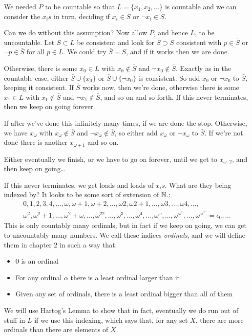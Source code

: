 \documentclass[10pt,a4paper]{article}
\begin{document}
We needed $P$ to be countable so that $L = \{x_1, x_2, \ldots\}$ is countable and we can consider the $x_is$ in turn, deciding if $x_i \in \bar{S}$ or $\neg x_i \in \bar{S}$.

Can we do without this assumption? Now allow $P$, and hence $L$, to be uncountable. Let $S \subset L$ be consistent and look for $\bar{S} \supset S$ consistent with $p \in \bar{S}$ or $\neg p \in \bar{S}$ for all $p \in L$. We could try $\bar{S} = S$, and if it works then we are done.

Otherwise, there is some $x_0 \in L$ with $x_0 \notin \bar{S}$ and $\neg x_0 \notin \bar{S}$. Exactly as in the countable case, either $\bar{S}\cup\{x_0\}$ or $\bar{S} \cup \{\neg x_0\}$ is consistent. So add $x_0$ or $\neg x_0$ to $\bar{S}$, keeping it consistent. If $\bar{S}$ works now, then we're done, otherwise there is some $x_1 \in L$ with $x_1 \notin \bar{S}$ and $\neg x_1 \notin \bar{S}$, and so on and so forth. If this never terminates, then we keep on going forever.

If after we've done this infinitely many times, if we are done the stop. Otherwise, we have $x_{\omega}$ with $x_{\omega} \notin \bar{S}$ and $\neg x_{\omega} \notin \bar{S}$, so either add $x_{\omega}$ or $\neg x_{\omega}$ to $\bar{S}$. If we're not done there is another $x_{\omega+1}$ and so on.

Either eventually we finish, or we have to go on forever, until we get to $x_{\omega\cdot 2}$, and then keep on going\ldots

If this never terminates, we get loads and loads of $x_is$. What are they being indexed by? It looks to be some sort of extension of $\mathbb{N}$.:
\begin{align*}
0,1,2,3,4,\ldots,\omega,\omega+1,\omega+2,\ldots,\omega2,\omega2+1,\ldots,\omega3,\ldots,\omega4,\ldots,\\\omega^2,\omega^2+1,\ldots,\omega^2+\omega,\ldots,\omega^22,\ldots, \omega^3,\ldots,\omega^4,\ldots,\omega^\omega,\ldots,\omega^{\omega^\omega},\ldots,\omega^{\omega^{\omega^{\iddots}}}=\epsilon_0,\ldots
\end{align*}
This is only countably many ordinals, but in fact if we keep on going, we can get to uncountably many numbers. We call these indices \emph{ordinals}, and we will define them in chapter 2 in such a way that:
\begin{itemize}
\item 0 is an ordinal
\item For any ordinal $\alpha$ there is a least ordinal larger than it
\item Given any set of ordinals, there is a least ordinal bigger than all of them
\end{itemize}
We will use Hartog's Lemma to show that in fact, eventually we do run out of stuff in $L$ if we use this indexing, which says that, for any set $X$, there are more ordinals than there are elements of $X$.
\end{document}
